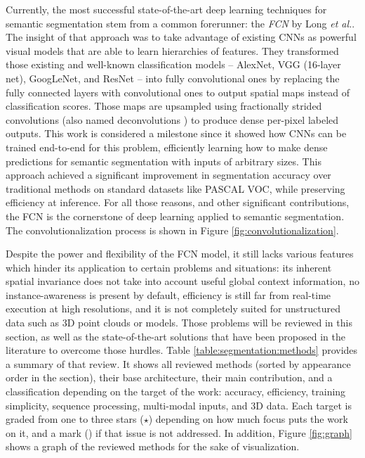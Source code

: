 Currently, the most successful state-of-the-art deep learning techniques for semantic segmentation stem from a common forerunner: the \emph{\acf{FCN}} by Long \emph{et al.}\cite{Long2015}. The insight of that approach was to take advantage of existing \acp{CNN} as powerful visual models that are able to learn hierarchies of features. They transformed those existing and well-known classification models -- AlexNet\cite{Krizhevsky2012}, \ac{VGG} (16-layer net)\cite{Simonyan2014}, GoogLeNet\cite{Szegedy2015}, and ResNet \cite{He2016} -- into fully convolutional ones by replacing the fully connected layers with convolutional ones to output spatial maps instead of classification scores. Those maps are upsampled using fractionally strided convolutions (also named deconvolutions \cite{Zeiler2011}\cite{Zeiler2014}) to produce dense per-pixel labeled outputs. This work is considered a milestone since it showed how \acp{CNN} can be trained end-to-end for this problem, efficiently learning how to make dense predictions for semantic segmentation with inputs of arbitrary sizes. This approach achieved a significant improvement in segmentation accuracy over traditional methods on standard datasets like PASCAL \ac{VOC}, while preserving efficiency at inference. For all those reasons, and other significant contributions, the \ac{FCN} is the cornerstone of deep learning applied to semantic segmentation. The convolutionalization process is shown in Figure \ref{fig:convolutionalization}.

Despite the power and flexibility of the \acs{FCN} model, it still lacks various features which hinder its application to certain problems and situations: its inherent spatial invariance does not take into account useful global context information, no instance-awareness is present by default, efficiency is still far from real-time execution at high resolutions, and it is not completely suited for unstructured data such as \acs{3D} point clouds or models. Those problems will be reviewed in this section, as well as the state-of-the-art solutions that have been proposed in the literature to overcome those hurdles. Table \ref{table:segmentation:methods} provides a summary of that review. It shows all reviewed methods (sorted by appearance order in the section), their base architecture, their main contribution, and a classification depending on the target of the work: accuracy, efficiency, training simplicity, sequence processing, multi-modal inputs, and \acs{3D} data. Each target is graded from one to three stars ($\star$) depending on how much focus puts the work on it, and a mark (\xmark) if that issue is not addressed. In addition, Figure \ref{fig:graph} shows a graph of the reviewed methods for the sake of visualization.

